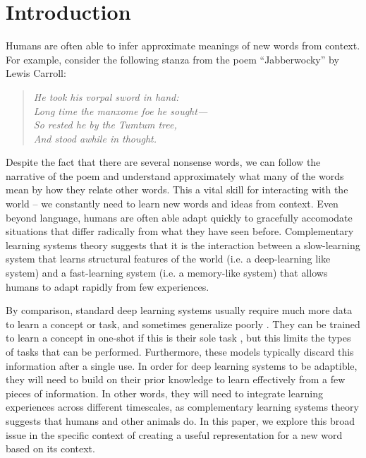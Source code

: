 \documentclass{article}
\begin{document}
\section{Introduction}
Humans are often able to infer approximate meanings of new words from context. For example, consider the following stanza from the poem ``Jabberwocky'' by Lewis Carroll: 
\begin{quote}
\centering
\textit{
He took his vorpal sword in hand:\\
Long time the manxome foe he sought—\\
So rested he by the Tumtum tree,\\
And stood awhile in thought.}
\end{quote}
Despite the fact that there are several nonsense words, we can follow the narrative of the poem and understand approximately what many of the words mean by how they relate other words. This a vital skill for interacting with the world -- we constantly need to learn new words and ideas from context. Even beyond language, humans are often able adapt quickly to gracefully accomodate situations that differ radically from what they have seen before. Complementary learning systems theory \citep{Kumaran2016} suggests that it is the interaction between a slow-learning system that learns structural features of the world (i.e. a deep-learning like system) and a fast-learning system (i.e. a memory-like system) that allows humans to adapt rapidly from few experiences. \par 
By comparison, standard deep learning systems usually require much more data to learn a concept or task, and sometimes generalize poorly \cite{Lake2016}. They can be trained to learn a concept in one-shot if this is their sole task \cite[e.g.]{Vinyals2016}, but this limits the types of tasks that can be performed. Furthermore, these models typically discard this information after a single use. In order for deep learning systems to be adaptible, they will need to build on their prior knowledge to learn effectively from a few pieces of information. In other words, they will need to integrate learning experiences across different timescales, as complementary learning systems theory suggests that humans and other animals do. In this paper, we explore this broad issue in the specific context of creating a useful representation for a new word based on its context. \par
\end{document}
